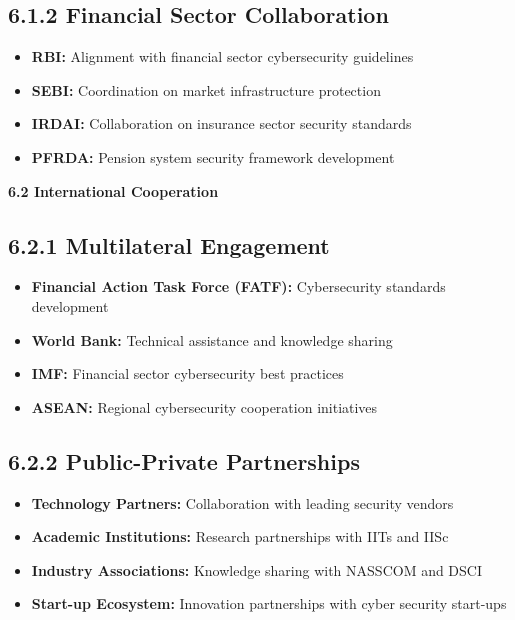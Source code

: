 \documentclass[12pt,a4paper]{report}
\newcommand{\sectionheader}[1]{\textbf{\color{govblue}#1}}
\begin{document}
\subsection*{6.1.2 Financial Sector Collaboration}
\begin{itemize}[leftmargin=*, itemsep=3pt]
    \item \textbf{RBI:} Alignment with financial sector cybersecurity guidelines
    \item \textbf{SEBI:} Coordination on market infrastructure protection
    \item \textbf{IRDAI:} Collaboration on insurance sector security standards
    \item \textbf{PFRDA:} Pension system security framework development
\end{itemize}

\sectionheader{6.2 International Cooperation}

\subsection*{6.2.1 Multilateral Engagement}
\begin{itemize}[leftmargin=*, itemsep=3pt]
    \item \textbf{Financial Action Task Force (FATF):} Cybersecurity standards development
    \item \textbf{World Bank:} Technical assistance and knowledge sharing
    \item \textbf{IMF:} Financial sector cybersecurity best practices
    \item \textbf{ASEAN:} Regional cybersecurity cooperation initiatives
\end{itemize}

\subsection*{6.2.2 Public-Private Partnerships}
\begin{itemize}[leftmargin=*, itemsep=3pt]
    \item \textbf{Technology Partners:} Collaboration with leading security vendors
    \item \textbf{Academic Institutions:} Research partnerships with IITs and IISc
    \item \textbf{Industry Associations:} Knowledge sharing with NASSCOM and DSCI
    \item \textbf{Start-up Ecosystem:} Innovation partnerships with cyber security start-ups
\end{itemize}
\end{document}
